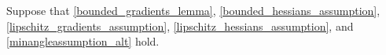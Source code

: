 Suppose that \cref{bounded_gradients_lemma}, \cref{bounded_hessians_assumption}, \cref{lipschitz_gradients_assumption}, \cref{lipschitz_hessians_assumption}, and \cref{minangleassumption_alt} hold.
